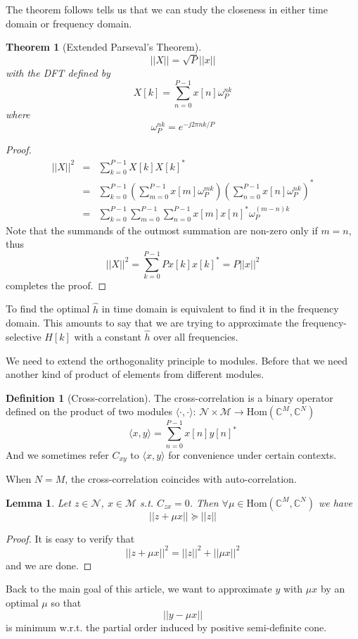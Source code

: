 \documentclass[12pt]{article}
\newtheorem{lemma}{Lemma}
\newtheorem{theorem}{Theorem}
\theoremstyle{definition}
\newtheorem{definition}{Definition}
\begin{document}
The theorem follows tells us that we can study the closeness in either time domain or frequency domain.
\begin{theorem}[Extended Parseval's Theorem]\label{thm parseval}
	$$||X||=\sqrt{P}||x||$$
	with the DFT defined by
	$$X[k]=\sum_{n=0}^{P-1}x[n]\omega_P^{nk}$$
	where
	$$\omega_P^{nk}=e^{-j2\pi nk/P}$$
\end{theorem}
\begin{proof}
	\begin{eqnarray*}
	||X||^2&=&\sum_{k=0}^{P-1}X[k]X[k]^*\\
	&=&\sum_{k=0}^{P-1}\left(\sum_{m=0}^{P-1}x[m]\omega_P^{mk} \right)\left(\sum_{n=0}^{P-1}x[n]\omega_P^{nk} \right)^*\\
	&=&\sum_{k=0}^{P-1}\sum_{m=0}^{P-1}\sum_{n=0}^{P-1}x[m]x[n]^*\omega_P^{(m-n)k}
	\end{eqnarray*}
Note that the summands of the outmost summation are non-zero only if $m=n$, thus
$$||X||^2=\sum_{k=0}^{P-1}Px[k]x[k]^*=P||x||^2$$
completes the proof.
\end{proof}
To find the optimal $\hat{h}$ in time domain is equivalent to find it in the frequency domain. This amounts to say that we are trying to approximate the frequency-selective $H[k]$ with a constant $\hat{h}$ over all frequencies.

We need to extend the orthogonality principle to modules. Before that we need another kind of product of elements from different modules.
\begin{definition}[Cross-correlation]\label{def crosscorrelation}
	The cross-correlation is a binary operator defined on the product of two modules $\langle\cdot,\cdot\rangle$: $\mathcal{N}\times \mathcal{M}\rightarrow\mbox{Hom}\left(\mathbb{C}^M,\mathbb{C}^N \right)$
	$$\langle x,y\rangle=\sum_{n=0}^{P-1}x[n]y[n]^*$$
	And we sometimes refer $C_{xy}$ to $\langle x,y\rangle$ for convenience under certain contexts.
\end{definition}
When $N=M$, the cross-correlation coincides with auto-correlation.
\begin{lemma}\label{lemma |z+mux|>=|z|}
	Let $z\in\mathcal{N}$, $x\in\mathcal{M}$ s.t. $C_{zx}=0$. Then $\forall \mu\in\mbox{Hom}\left(\mathbb{C}^M,\mathbb{C}^N \right)$ we have
	$$||z+\mu x||\succeq||z||$$
\end{lemma}
\begin{proof}
	It is easy to verify that
	$$||z+\mu x||^2=||z||^2+||\mu x||^2$$
	and we are done.
\end{proof}
Back to the main goal of this article, we want to approximate $y$ with $\mu x$ by an optimal $\mu$ so that
$$||y-\mu x||$$
is minimum w.r.t. the partial order induced by positive semi-definite cone.
\end{document}
